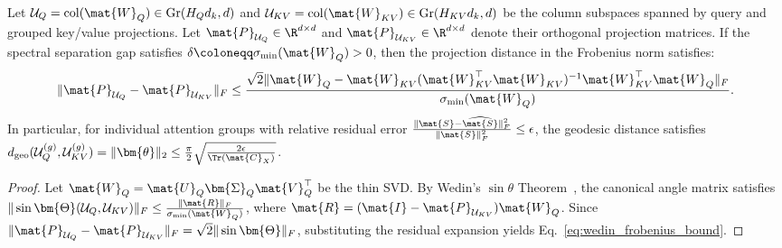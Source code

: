 \begin{lemma}
\label{lem:wedin_subspace_perturbation}
Let $\mathcal{U}_Q = \operatorname{col}(\mat{W}_Q) \in \operatorname{Gr}(H_Q d_k, d)$ and $\mathcal{U}_{KV} = \operatorname{col}(\mat{W}_{KV}) \in \operatorname{Gr}(H_{KV} d_k, d)$ be the column subspaces spanned by query and grouped key/value projections.
Let $\mat{P}_{\mathcal{U}_Q} \in \R^{d \times d}$ and $\mat{P}_{\mathcal{U}_{KV}} \in \R^{d \times d}$ denote their orthogonal projection matrices.
If the spectral separation gap satisfies $\delta \coloneqq \sigma_{\min}(\mat{W}_Q) > 0$, then the projection distance in the Frobenius norm satisfies:
\begin{equation}
\|\mat{P}_{\mathcal{U}_Q} - \mat{P}_{\mathcal{U}_{KV}}\|_F \le \frac{\sqrt{2} \|\mat{W}_Q - \mat{W}_{KV} (\mat{W}_{KV}^\top \mat{W}_{KV})^{-1} \mat{W}_{KV}^\top \mat{W}_Q\|_F}{\sigma_{\min}(\mat{W}_Q)}.
\label{eq:wedin_frobenius_bound}
\end{equation}
In particular, for individual attention groups with relative residual error $\frac{\|\mat{S} - \widehat{\mat{S}}\|_F^2}{\|\mat{S}\|_F^2} \le \epsilon$, the geodesic distance satisfies $d_{\text{geo}}(\mathcal{U}_Q^{(g)}, \mathcal{U}_{KV}^{(g)}) = \|\bm{\theta}\|_2 \le \frac{\pi}{2} \sqrt{\frac{2\epsilon}{\Tr(\mat{C}_X)}}$.
\end{lemma}

\begin{proof}
Let $\mat{W}_Q = \mat{U}_Q \bm{\Sigma}_Q \mat{V}_Q^\top$ be the thin SVD. By Wedin's $\sin \theta$ Theorem~\cite{edelman1998geometry,golub2013matrix}, the canonical angle matrix satisfies $\|\sin \bm{\Theta}(\mathcal{U}_Q, \mathcal{U}_{KV})\|_F \le \frac{\|\mat{R}\|_F}{\sigma_{\min}(\mat{W}_Q)}$, where $\mat{R} = (\mat{I} - \mat{P}_{\mathcal{U}_{KV}}) \mat{W}_Q$.
Since $\|\mat{P}_{\mathcal{U}_Q} - \mat{P}_{\mathcal{U}_{KV}}\|_F = \sqrt{2} \|\sin \bm{\Theta}\|_F$, substituting the residual expansion yields Eq.~\eqref{eq:wedin_frobenius_bound}.
\end{proof}

